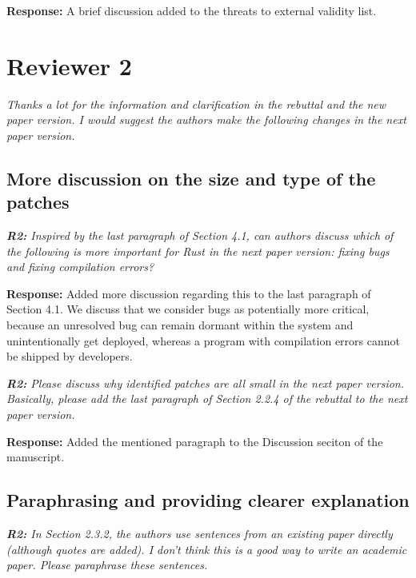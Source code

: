 \documentclass{article}
\begin{document}
\vspace*{1em} \noindent \textbf{Response:} A brief discussion added to the threats to external validity list.

\section{Reviewer 2}

\textit{Thanks a lot for the information and clarification in the rebuttal and the new paper version. I would suggest the authors make the following changes in the next paper version.}

\subsection{More discussion on the size and type of the patches}

\textit{\textbf{R2:} Inspired by the last paragraph of Section 4.1, can authors discuss which of the following is more important for Rust in the next paper version: fixing bugs and fixing compilation errors?}

\vspace*{1em} \noindent \textbf{Response:} Added more discussion regarding this to the last paragraph of Section 4.1. We discuss that we consider bugs as potentially more critical, because an unresolved bug can remain dormant within the system and unintentionally get deployed, whereas a program with compilation errors cannot be shipped by developers.

\vspace*{1em} \noindent \textit{\textbf{R2:} Please discuss why identified patches are all small in the next paper version. Basically, please add the last paragraph of Section 2.2.4 of the rebuttal to the next paper version.}

\vspace*{1em} \noindent \textbf{Response:} Added the mentioned paragraph to the Discussion seciton of the manuscript. 

\subsection{Paraphrasing and providing clearer explanation}

\textit{\textbf{R2:} In Section 2.3.2, the authors use sentences from an existing paper directly (although quotes are added). I don't think this is a good way to write an academic paper. Please paraphrase these sentences.}
\end{document}
